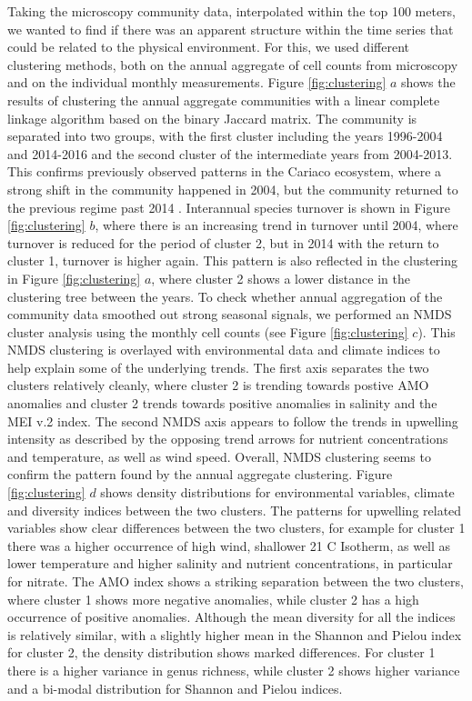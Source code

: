 \documentclass[draft]{agujournal2019}
\begin{document}
Taking the microscopy community data, interpolated within the top 100 meters, we wanted to find if there was an apparent structure within the time series that could be related to the physical environment. For this, we used different clustering methods, both on the annual aggregate of cell counts from microscopy and on the individual monthly measurements. Figure \ref{fig:clustering} $a$ shows the results of clustering the annual aggregate communities with a linear complete linkage algorithm based on the binary Jaccard matrix. The community is separated into two groups, with the first cluster including the years 1996-2004 and 2014-2016 and the second cluster of the intermediate years from 2004-2013. This confirms previously observed patterns in the Cariaco ecosystem, where a strong shift in the community happened in 2004, but the community returned to the previous regime past 2014 \cite{taylor_ecosystem_2012, muller-karger_scientific_2019}.
Interannual species turnover is shown in Figure \ref{fig:clustering} $b$, where there is an increasing trend in turnover until 2004, where turnover is reduced for the period of cluster 2, but in 2014 with the return to cluster 1, turnover is higher again. This pattern is also reflected in the clustering in Figure \ref{fig:clustering} $a$, where cluster 2 shows a lower distance in the clustering tree between the years. 
To check whether annual aggregation of the community data smoothed out strong seasonal signals, we performed an NMDS cluster analysis using the monthly cell counts (see Figure \ref{fig:clustering} $c$). This NMDS clustering is overlayed with environmental data and climate indices to help explain some of the underlying trends. The first axis separates the two clusters relatively cleanly, where cluster 2 is trending towards postive AMO anomalies and cluster 2 trends towards positive anomalies in salinity and the MEI v.2 index. The second NMDS axis appears to follow the trends in upwelling intensity as described by the opposing trend arrows for nutrient concentrations and temperature, as well as wind speed. Overall, NMDS clustering seems to confirm the pattern found by the annual aggregate clustering. 
Figure \ref{fig:clustering} $d$ shows density distributions for environmental variables, climate and diversity indices between the two clusters. The patterns for upwelling related variables show clear differences between the two clusters, for example for cluster 1 there was a higher occurrence of high wind, shallower 21 \degree C Isotherm, as well as lower temperature and higher salinity and nutrient concentrations, in particular for nitrate. The AMO index shows a striking separation between the two clusters, where cluster 1 shows more negative anomalies, while cluster 2 has a high occurrence of positive anomalies. Although the mean diversity for all the indices is relatively similar, with a slightly higher mean in the Shannon and Pielou index for cluster 2, the density distribution shows marked differences. For cluster 1 there is a higher variance in genus richness, while cluster 2 shows higher variance and a bi-modal distribution for Shannon and Pielou indices. 
\end{document}
